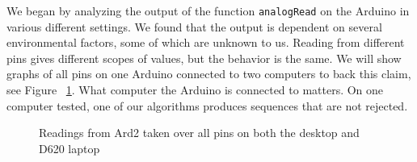 \documentclass[a4paper]{article}           %
\begin{document}
We began by analyzing the output of the function \texttt{analogRead} on the Arduino in various different settings. We found that the output is dependent on several environmental factors, some of which are unknown to us. Reading from different pins gives different scopes of values, but the behavior is the same. We will show graphs of all pins on one Arduino connected to two computers to back this claim, see Figure ~\ref{fig:allpins}. What computer the Arduino is connected to matters. On one computer tested, one of our algorithms produces sequences that are not rejected. 

  \begin{figure}[h!]
    \centering  

    \caption{Readings from Ard2 taken over all pins on both the desktop and D620 laptop}
    \label{fig:allpins}
        
  \end{figure}
\end{document}
